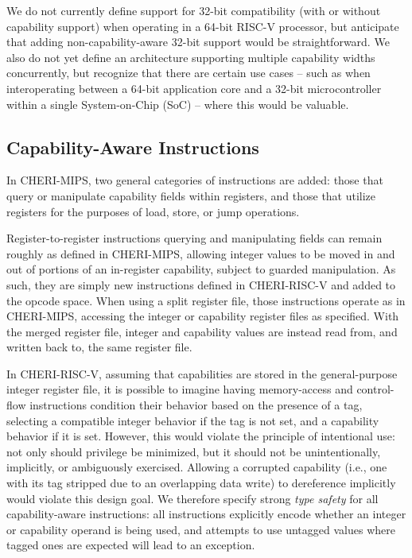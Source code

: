 We do not currently define support for 32-bit compatibility (with or without
capability support) when operating in a 64-bit RISC-V processor, but
anticipate that adding non-capability-aware 32-bit support would be
straightforward.
We also do not yet define an architecture supporting multiple capability
widths concurrently, but recognize that there are certain use cases -- such as
when interoperating between a 64-bit application core and a 32-bit
microcontroller within a single System-on-Chip (SoC) -- where this would be
valuable.

\subsection{Capability-Aware Instructions}

In CHERI-MIPS, two general categories of instructions are added: those that
query or manipulate capability fields within registers, and those that
utilize registers for the purposes of load, store, or jump operations.

Register-to-register instructions querying and manipulating fields can remain
roughly as defined in CHERI-MIPS, allowing integer values to be moved in and
out of portions of an in-register capability, subject to guarded manipulation.
As such, they are simply new instructions defined in CHERI-RISC-V and added to
the opcode space.
When using a split register file, those instructions operate as in CHERI-MIPS,
accessing the integer or capability register files as specified.
With the merged register file, integer and capability values are instead read
from, and written back to, the same register file.

In CHERI-RISC-V, assuming that capabilities are stored in the general-purpose
integer register file, it is possible to imagine having memory-access and
control-flow instructions condition their behavior based on the presence of a
tag, selecting a compatible integer behavior if the tag is not set, and a
capability behavior if it is set.
However, this would violate the principle of intentional use: not only should
privilege be minimized, but it should not be unintentionally, implicitly, or
ambiguously exercised.
Allowing a corrupted capability (i.e., one with its tag stripped due to an
overlapping data write) to dereference \DDC{} implicitly would violate this
design goal.
We therefore specify strong \textit{type safety} for all capability-aware
instructions: all instructions explicitly encode whether an integer or
capability operand is being used, and attempts to use untagged values where
tagged ones are expected will lead to an exception.

